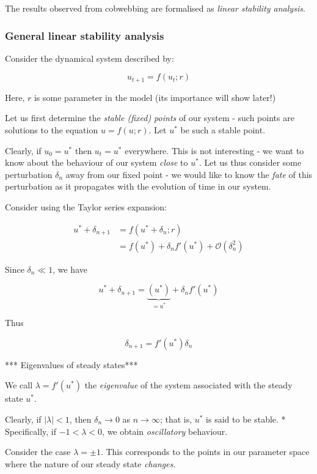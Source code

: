 \documentclass[11pt]{article}
\begin{document}
The results observed from cobwebbing are formalised as \emph{linear
stability analysis}.

\subsubsection{General linear stability
analysis}\label{general-linear-stability-analysis}

Consider the dynamical system described by:

\[u_{t+1} = f(u_t ; r)\]

Here, \(r\) is some parameter in the model (its importance will show
later!)

Let us first determine the \emph{stable (fixed) points} of our system -
such points are solutions to the equation \(u = f(u; r)\). Let \(u^*\)
be such a stable point.

Clearly, if \(u_0 = u^*\) then \(u_t = u^*\) everywhere. This is not
interesting - we want to know about the behaviour of our system
\emph{close} to \(u^*\). Let us thus consider some perturbation
\(\delta_n\) away from our fixed point - we would like to know the
\emph{fate} of this perturbation as it propagates with the evolution of
time in our system.

Consider using the Taylor series expansion:

\begin{align}
    u^* + \delta_{n+1} &= f(u^* + \delta_n; r)\\
    &= f(u^*) + \delta_nf'(u^*) + \mathcal{O}(\delta_n^2)
\end{align}

Since \(\delta_n \ll 1\), we have

\[u^* + \delta_{n+1} = \underbrace{(u^*)}_{ = u^*} + \delta_nf'(u^*)\]

Thus

\[\delta_{n+1} = f'(u^*)\delta_n\]

*** Eigenvalues of steady states***

We call \(\lambda = f'(u^*)\) the \emph{eigenvalue} of the system
associated with the steady state \(u^*\).

Clearly, if \(|\lambda| < 1\), then \(\delta_{n} \to 0\) as
\(n \to \infty\); that is, \(u^*\) is said to be stable. * Specifically,
if \(-1 < \lambda < 0\), we obtain \emph{oscillatory} behaviour.

Consider the case \(\lambda = \pm 1\). This corresponds to the points in
our parameter space where the nature of our steady state \emph{changes}.
\end{document}
